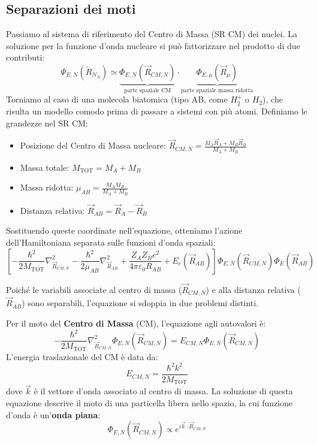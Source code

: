 \subsection{Separazioni dei moti}
Passiamo al sistema di riferimento del Centro di Massa (SR CM) dei nuclei. La soluzione per la funzione d'onda nucleare si può fattorizzare nel prodotto di due contributi:
\begin{equation}
    \Psi_{E,N}(\tilde{R}_{N_N}) \simeq \underbrace{\Phi_{E,N}(\vec{R}_{CM,N})}_{\text{parte spaziale CM}} \cdot \underbrace{\Phi_{E,\mu}(\vec{R}_\mu)}_{\text{parte spaziale massa ridotta}}
\end{equation}
Torniamo al caso di una molecola biatomica (tipo AB, come \( H_2^+ \) o \( H_2 \)), che risulta un modello comodo prima di passare a sistemi con più atomi. Definiamo le grandezze nel SR CM:
\begin{itemize}
    \item Posizione del Centro di Massa nucleare: \( \vec{R}_{CM,N} = \frac{M_A \vec{R}_A + M_B \vec{R}_B}{M_A + M_B} \)
    \item Massa totale: \( M_{\text{TOT}} = M_A + M_B \)
    \item Massa ridotta: \( \mu_{AB} = \frac{M_A M_B}{M_A + M_B} \)
    \item Distanza relativa: \( \vec{R}_{AB} = \vec{R}_A - \vec{R}_B \)
\end{itemize}

Sostituendo queste coordinate nell'equazione, otteniamo l'azione dell'Hamiltoniana separata sulle funzioni d'onda spaziali:
\begin{equation}
\left[ -\frac{\hbar^2}{2M_{\text{TOT}}} \nabla_{\vec{R}_{CM,N}}^2 - \frac{\hbar^2}{2\mu_{AB}} \nabla_{\vec{R}_{AB}}^2 + \frac{Z_A Z_B e^2}{4\pi\varepsilon_0 R_{AB}} + E_e(\vec{R}_{AB}) \right] \Phi_{E,N}(\vec{R}_{CM,N}) \Phi_E(\vec{R}_{AB}) 
\end{equation}

Poiché le variabili associate al centro di massa (\(\vec{R}_{CM,N}\)) e alla distanza relativa (\(\vec{R}_{AB}\)) sono separabili, l'equazione si sdoppia in due problemi distinti.

Per il moto del \textbf{Centro di Massa} (CM), l'equazione agli autovalori è:
\begin{equation}
    -\frac{\hbar^2}{2M_{\text{TOT}}} \nabla_{\vec{R}_{CM,N}}^2 \Phi_{E,N}(\vec{R}_{CM,N}) = E_{CM,N} \Phi_{E,N}(\vec{R}_{CM,N})
\end{equation}
L'energia traslazionale del CM è data da:
\begin{equation}
    E_{CM,N} = \frac{\hbar^2 k^2}{2M_{\text{TOT}}}
\end{equation}
dove \(\vec{k}\) è il vettore d'onda associato al centro di massa. La soluzione di questa equazione descrive il moto di una particella libera nello spazio, la cui funzione d'onda è un'\textbf{onda piana}:
\begin{equation}
    \Phi_{E,N}(\vec{R}_{CM,N}) \propto e^{i \vec{k} \cdot \vec{R}_{CM,N}}
\end{equation}

